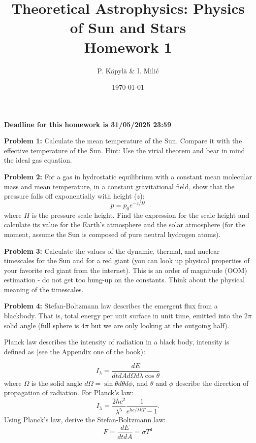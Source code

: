 \documentclass[12pt]{article}
\title{Theoretical Astrophysics: Physics of Sun and Stars\\
Homework 1}
\author{P. K\"{a}pyl\"{a} \& I. Mili\'{c}}
\date{\today}
\begin{document}
\maketitle

\textbf{Deadline for this homework is 31/05/2025 23:59}

{\bf Problem 1:} Calculate the mean temperature of the Sun. Compare it
with the effective temperature of the Sun. Hint: Use the virial
theorem and bear in mind the ideal gas equation.

{\bf Problem 2:} For a gas in hydrostatic equilibrium with a constant
mean molecular mass and mean temperature, in a constant gravitational
field, show that the pressure falls off exponentially with height
($z$):
\begin{equation}
p = p_0 e^{-z/H}
\end{equation}
where $H$ is the pressure scale height. Find the expression for the
scale height and calculate its value for the Earth's atmosphere and
the solar atmosphere (for the moment, assume the Sun is composed of
pure neutral hydrogen atoms).

{\bf Problem 3:} Calculate the values of the dynamic, thermal, and
nuclear timescales for the Sun and for a red giant (you can look up
physical properties of your favorite red giant from the
internet). This is an order of magnitude (OOM) estimation - do not get
too hung-up on the constants. Think about the physical meaning of the
timescales.

{\bf Problem 4:} Stefan-Boltzmann law describes the emergent flux from
a blackbody. That is, total energy per unit surface in unit time,
emitted into the $2\pi$ solid angle (full sphere is $4\pi$ but we are
only looking at the outgoing half).

Planck law describes the intensity of radiation in a black body,
intensity is defined as (see the Appendix one of the book):

\begin{equation}
I_\lambda = \frac{dE}{dt dA d\Omega d\lambda \cos \theta}
\end{equation}
where $\Omega$ is the solid angle $d\Omega = \sin \theta d\theta
d\phi$, and $\theta$ and $\phi$ describe the direction of propagation
of radiation. For Planck's law:
\begin{equation}
I_\lambda = \frac{2hc^2}{\lambda^5} \frac{1}{e^{hc/\lambda k T} - 1}.
\end{equation}
Using Planck's law, derive the Stefan-Boltzmann law:
\begin{equation}
F = \frac{dE}{dt dA} = \sigma T^4
\end{equation}
\end{document}
